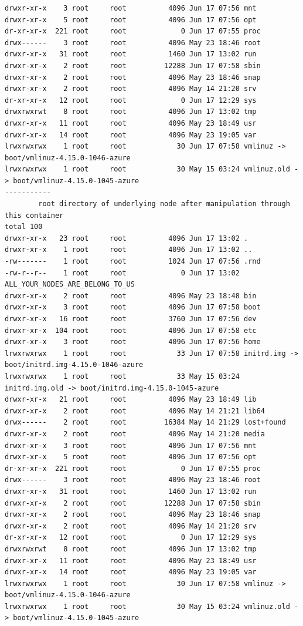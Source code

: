\begin{lstlisting}
drwxr-xr-x    3 root     root          4096 Jun 17 07:56 mnt
drwxr-xr-x    5 root     root          4096 Jun 17 07:56 opt
dr-xr-xr-x  221 root     root             0 Jun 17 07:55 proc
drwx------    3 root     root          4096 May 23 18:46 root
drwxr-xr-x   31 root     root          1460 Jun 17 13:02 run
drwxr-xr-x    2 root     root         12288 Jun 17 07:58 sbin
drwxr-xr-x    2 root     root          4096 May 23 18:46 snap
drwxr-xr-x    2 root     root          4096 May 14 21:20 srv
dr-xr-xr-x   12 root     root             0 Jun 17 12:29 sys
drwxrwxrwt    8 root     root          4096 Jun 17 13:02 tmp
drwxr-xr-x   11 root     root          4096 May 23 18:49 usr
drwxr-xr-x   14 root     root          4096 May 23 19:05 var
lrwxrwxrwx    1 root     root            30 Jun 17 07:58 vmlinuz -> boot/vmlinuz-4.15.0-1046-azure
lrwxrwxrwx    1 root     root            30 May 15 03:24 vmlinuz.old -> boot/vmlinuz-4.15.0-1045-azure
-----------
        root directory of underlying node after manipulation through this container
total 100
drwxr-xr-x   23 root     root          4096 Jun 17 13:02 .
drwxr-xr-x    1 root     root          4096 Jun 17 13:02 ..
-rw-------    1 root     root          1024 Jun 17 07:56 .rnd
-rw-r--r--    1 root     root             0 Jun 17 13:02 ALL_YOUR_NODES_ARE_BELONG_TO_US
drwxr-xr-x    2 root     root          4096 May 23 18:48 bin
drwxr-xr-x    3 root     root          4096 Jun 17 07:58 boot
drwxr-xr-x   16 root     root          3760 Jun 17 07:56 dev
drwxr-xr-x  104 root     root          4096 Jun 17 07:58 etc
drwxr-xr-x    3 root     root          4096 Jun 17 07:56 home
lrwxrwxrwx    1 root     root            33 Jun 17 07:58 initrd.img -> boot/initrd.img-4.15.0-1046-azure
lrwxrwxrwx    1 root     root            33 May 15 03:24 initrd.img.old -> boot/initrd.img-4.15.0-1045-azure
drwxr-xr-x   21 root     root          4096 May 23 18:49 lib
drwxr-xr-x    2 root     root          4096 May 14 21:21 lib64
drwx------    2 root     root         16384 May 14 21:29 lost+found
drwxr-xr-x    2 root     root          4096 May 14 21:20 media
drwxr-xr-x    3 root     root          4096 Jun 17 07:56 mnt
drwxr-xr-x    5 root     root          4096 Jun 17 07:56 opt
dr-xr-xr-x  221 root     root             0 Jun 17 07:55 proc
drwx------    3 root     root          4096 May 23 18:46 root
drwxr-xr-x   31 root     root          1460 Jun 17 13:02 run
drwxr-xr-x    2 root     root         12288 Jun 17 07:58 sbin
drwxr-xr-x    2 root     root          4096 May 23 18:46 snap
drwxr-xr-x    2 root     root          4096 May 14 21:20 srv
dr-xr-xr-x   12 root     root             0 Jun 17 12:29 sys
drwxrwxrwt    8 root     root          4096 Jun 17 13:02 tmp
drwxr-xr-x   11 root     root          4096 May 23 18:49 usr
drwxr-xr-x   14 root     root          4096 May 23 19:05 var
lrwxrwxrwx    1 root     root            30 Jun 17 07:58 vmlinuz -> boot/vmlinuz-4.15.0-1046-azure
lrwxrwxrwx    1 root     root            30 May 15 03:24 vmlinuz.old -> boot/vmlinuz-4.15.0-1045-azure
\end{lstlisting}
